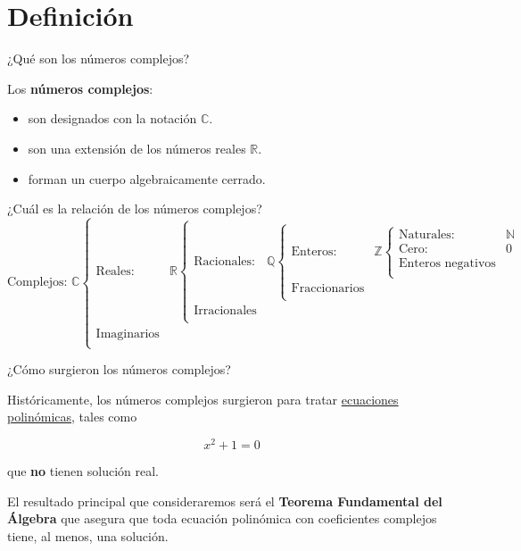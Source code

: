 
\section{Definición}

\begin{frame}[c]{¿Qué son los números complejos?}

  Los \textbf{números complejos}:

  \begin{itemize}
    \item son designados con la notación $\mathbb{C}$.
    \pausa
    \item son una extensión de los números reales $\mathbb{R}$.
    \pausa
    \item forman un cuerpo algebraicamente cerrado.
  \end{itemize}
\end{frame}

\begin{frame}[c]{¿Cuál es la relación de los números complejos?}
  \[
    \text{Complejos: }\mathbb{C} \begin{cases}
      \text{Reales:} & \mathbb{R} \begin{cases}
        \text{Racionales:} & \mathbb{Q} \begin{cases}
          \text{Enteros:} & \mathbb{Z} \begin{cases}
            \text{Naturales:} & \mathbb{N} \\
            \text{Cero:} & 0 \\
            \text{Enteros negativos} & \\
            \end{cases} \\
          \text{Fraccionarios} &  \\
          \end{cases} \\
        \text{Irracionales} &  \\
        \end{cases} \\
      \text{Imaginarios} & \\
    \end{cases}
  \]
\end{frame}

\begin{frame}[c]{¿Cómo surgieron los números complejos?}

  Históricamente, los números complejos surgieron para tratar
  \underline{ecuaciones polinómicas}, tales como

  \begin{displaymath}
    x^2 + 1 = 0
  \end{displaymath}

  que \textbf{no} tienen solución real.

  \vspace{\baselineskip}
  El resultado principal que consideraremos será el
  \textbf{Teorema Fundamental del Álgebra} que asegura que toda
  ecuación polinómica con coeficientes complejos tiene, al menos,
  una solución.
\end{frame}

